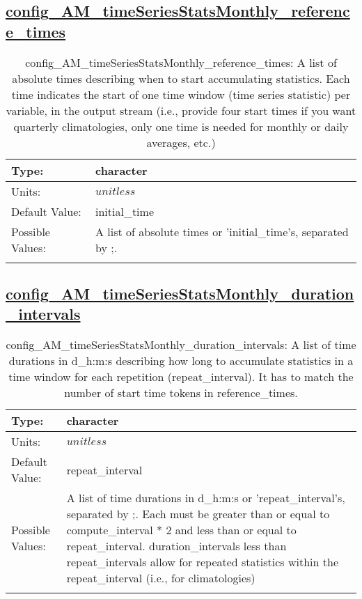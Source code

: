 \subsection[config\_AM\_timeSeriesStatsMonthly\_reference\_times]{\hyperref[sec:nm_tab_AM_timeSeriesStatsMonthly]{config\_AM\_timeSeriesStatsMonthly\_reference\_times}}
\label{subsec:nm_sec_config_AM_timeSeriesStatsMonthly_reference_times}
\begin{center}
\begin{longtable}{| p{2.0in} || p{4.0in} |}
    \hline
    Type: & character \\
    \hline
    Units: & $unitless$ \\
    \hline
    Default Value: & initial\_time \\
    \hline
    Possible Values: & A list of absolute times or 'initial\_time's, separated by ;. \\
    \hline
    \caption{config\_AM\_timeSeriesStatsMonthly\_reference\_times: A list of absolute times describing when to start accumulating statistics. Each time indicates the start of one time window (time series statistic) per variable, in the output stream (i.e., provide four start times if you want quarterly climatologies, only one time is needed for monthly or daily averages, etc.)}
\end{longtable}
\end{center}
\subsection[config\_AM\_timeSeriesStatsMonthly\_duration\_intervals]{\hyperref[sec:nm_tab_AM_timeSeriesStatsMonthly]{config\_AM\_timeSeriesStatsMonthly\_duration\_intervals}}
\label{subsec:nm_sec_config_AM_timeSeriesStatsMonthly_duration_intervals}
\begin{center}
\begin{longtable}{| p{2.0in} || p{4.0in} |}
    \hline
    Type: & character \\
    \hline
    Units: & $unitless$ \\
    \hline
    Default Value: & repeat\_interval \\
    \hline
    Possible Values: & A list of time durations in d\_h:m:s or 'repeat\_interval's, separated by ;. Each must be greater than or equal to compute\_interval * 2 and less than or equal to repeat\_interval. duration\_intervals less than repeat\_intervals allow for repeated statistics within the repeat\_interval (i.e., for climatologies) \\
    \hline
    \caption{config\_AM\_timeSeriesStatsMonthly\_duration\_intervals: A list of time durations in d\_h:m:s describing how long to accumulate statistics in a time window for each repetition (repeat\_interval). It has to match the number of start time tokens in reference\_times.}
\end{longtable}
\end{center}
